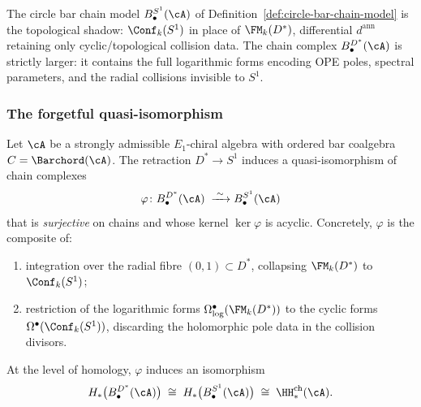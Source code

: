 The circle bar chain model
$B^{S^1}_\bullet(\cA)$
of Definition~\ref{def:circle-bar-chain-model}
is the topological shadow: $\Conf_k(S^1)$ in place of $\FM_k(D^*)$, differential $d^{\mathrm{ann}}$ retaining only cyclic/topological collision data. The chain complex
$B^{D^*}_\bullet(\cA)$ is strictly larger: it contains
the full logarithmic forms encoding OPE poles,
spectral parameters, and the radial collisions
invisible to $S^1$.

\subsubsection{The forgetful quasi-isomorphism}

\begin{proposition}%
\label{prop:punctured-disk-S1-qiso}%
%
%
%
Let $\cA$ be a strongly admissible $E_1$-chiral algebra
with ordered bar coalgebra $C=\Barchord(\cA)$.
The retraction $D^*\to S^1$ induces a quasi-isomorphism
of chain complexes
\begin{equation}\label{eq:punctured-disk-S1-qiso}
\varphi\colon
B^{D^*}_\bullet(\cA)
\;\xrightarrow{\;\sim\;}
B^{S^1}_\bullet(\cA)
\end{equation}
that is \emph{surjective} on chains and whose kernel
$\ker\varphi$ is acyclic. Concretely, $\varphi$ is
the composite of:
\begin{enumerate}[label=\textup{(\alph*)}]
\item integration over the radial fibre
 $(0,1)\subset D^*$, collapsing $\FM_k(D^*)$ to
 $\Conf_k(S^1)$;
\item restriction of the logarithmic forms
 $\Omega^\bullet_{\log}(\FM_k(D^*))$ to the
 cyclic forms $\Omega^\bullet(\Conf_k(S^1))$,
 discarding the holomorphic pole data in the
 collision divisors.
\end{enumerate}
At the level of homology, $\varphi$ induces an
isomorphism
\begin{equation}\label{eq:punctured-disk-homology}
H_*\bigl(B^{D^*}_\bullet(\cA)\bigr)
\;\cong\;
H_*\bigl(B^{S^1}_\bullet(\cA)\bigr)
\;\cong\;
\HH^{\mathrm{ch}}_*(\cA).
\end{equation}
\end{proposition}

